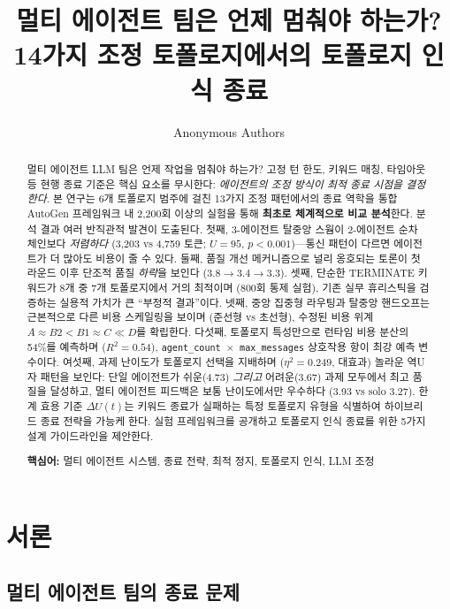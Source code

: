 \documentclass[a4paper,11pt]{article}
\title{멀티 에이전트 팀은 언제 멈춰야 하는가? \\ 14가지 조정 토폴로지에서의 토폴로지 인식 종료}
\author{Anonymous Authors}
\date{}
\begin{document}
\maketitle

\begin{abstract}
멀티 에이전트 LLM 팀은 언제 작업을 멈춰야 하는가? 고정 턴 한도, 키워드 매칭, 타임아웃 등 현행 종료 기준은 핵심 요소를 무시한다: \emph{에이전트의 조정 방식이 최적 종료 시점을 결정한다}. 본 연구는 6개 토폴로지 범주에 걸친 13가지 조정 패턴에서의 종료 역학을 통합 AutoGen 프레임워크 내 2,200회 이상의 실험을 통해 \textbf{최초로 체계적으로 비교 분석}한다. 분석 결과 여러 반직관적 발견이 도출된다. 첫째, 3-에이전트 탈중앙 스웜이 2-에이전트 순차 체인보다 \emph{저렴하다} (3,203 vs 4,759 토큰; $U=95$, $p<0.001$)---통신 패턴이 다르면 에이전트가 더 많아도 비용이 줄 수 있다. 둘째, 품질 개선 메커니즘으로 널리 옹호되는 토론이 첫 라운드 이후 단조적 품질 \emph{하락}을 보인다 ($3.8 \to 3.4 \to 3.3$). 셋째, 단순한 TERMINATE 키워드가 8개 중 7개 토폴로지에서 거의 최적이며 (800회 통제 실험), 기존 실무 휴리스틱을 검증하는 실용적 가치가 큰 ``부정적 결과''이다. 넷째, 중앙 집중형 라우팅과 탈중앙 핸드오프는 근본적으로 다른 비용 스케일링을 보이며 (준선형 vs 초선형), 수정된 비용 위계 $A \approx B2 < B1 \approx C \ll D$를 확립한다. 다섯째, 토폴로지 특성만으로 런타임 비용 분산의 54\%를 예측하며 ($R^2=0.54$), \texttt{agent\_count $\times$ max\_messages} 상호작용 항이 최강 예측 변수이다. 여섯째, 과제 난이도가 토폴로지 선택을 지배하며 ($\eta^2=0.249$, 대효과) 놀라운 역U자 패턴을 보인다: 단일 에이전트가 쉬운(4.73) \emph{그리고} 어려운(3.67) 과제 모두에서 최고 품질을 달성하고, 멀티 에이전트 피드백은 보통 난이도에서만 우수하다 (3.93 vs solo 3.27). 한계 효용 기준 $\Delta U(t)$는 키워드 종료가 실패하는 특정 토폴로지 유형을 식별하여 하이브리드 종료 전략을 가능케 한다. 실험 프레임워크를 공개하고 토폴로지 인식 종료를 위한 5가지 설계 가이드라인을 제안한다.

\medskip
\noindent\textbf{핵심어:} 멀티 에이전트 시스템, 종료 전략, 최적 정지, 토폴로지 인식, LLM 조정
\end{abstract}

\section{서론}

\subsection{멀티 에이전트 팀의 종료 문제}
\end{document}
